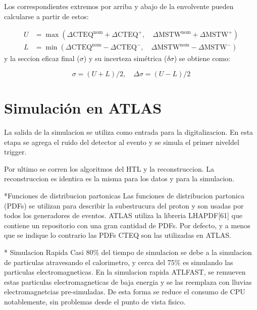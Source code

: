 Los correspondientes extremos por arriba y abajo de la envolvente pueden calcularse a partir de estos:

\begin{align}
  U &= \max(\Delta\mathrm{CTEQ}^\mathrm{nom} + \Delta\mathrm{CTEQ}^{+},\quad \Delta\mathrm{MSTW}^\mathrm{nom} + \Delta\mathrm{MSTW}^{+}) \\
  L &= \min(\Delta\mathrm{CTEQ}^\mathrm{nom} - \Delta\mathrm{CTEQ}^{-},\quad \Delta\mathrm{MSTW}^\mathrm{nom} - \Delta\mathrm{MSTW}^{-})
\end{align}
%
y la seccion eficaz final ($\sigma$) y su incerteza simétrica ($\delta\sigma$) se obtiene como:

\begin{equation}
  \sigma = (U+L)/2,\quad \Delta\sigma = (U-L)/2
\end{equation}




\section{Simulación en ATLAS}






La salida de la simulacion se utiliza como entrada para la digitalizacion.
En esta etapa se agrega el ruido del detector al evento y se simula
el primer niveldel trigger.

Por ultimo se corren los algoritmos del HTL y la reconstruccion.
La reconstruccion es identica es la misma para los datos y para
la simulacion.



*Funciones de distribucion partonicas
Las funciones de distribucion partonica (PDFs) se utilizan
para describir la subestrucura del proton y son usadas por
todos los generadores de eventos.
ATLAS utiliza la libreria LHAPDF[61] que contiene
un repositorio con una gran cantidad de PDFs. Por defecto, y
a menos que se indique lo contrario las PDFs CTEQ son las utilizadas
en ATLAS.


* Simulacion Rapida
Casi 80\% del tiempo de simulacion se debe a la simulacion
de particulas atravesando el calorimetro, y cerca del 75\%
es simulando las particulas electromagneticas. En la simulacion rapida
ATLFAST, se remueven estas particulas electromagneticas de baja energia
y se las reemplaza con lluvias electromagnetcias pre-simuladas.
De esta forma se reduce el consumo de CPU notablemente, sin problemas
desde el punto de vista fisico.





